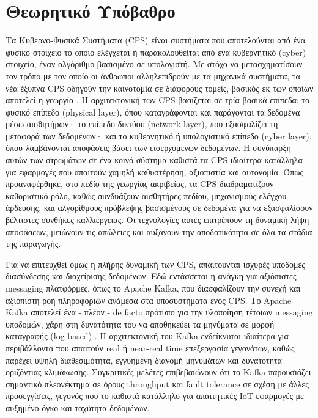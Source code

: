 \chapter{Θεωρητικό Υπόβαθρο}

Τα Κυβερνο-Φυσικά Συστήματα (CPS) είναι συστήματα που αποτελούνται από ένα
φυσικό στοιχείο το οποίο ελέγχεται ή παρακολουθείται από ένα κυβερνητικό
(cyber) στοιχείο, έναν αλγόριθμο βασισμένο σε υπολογιστή. Με στόχο να
μετασχηματίσουν τον τρόπο με τον οποίο οι άνθρωποι αλληλεπιδρούν με τα μηχανικά
συστήματα, τα νέα έξυπνα CPS οδηγούν την καινοτομία σε διάφορους τομείς,
βασικός εκ των οποίων αποτελεί η γεωργία \cite{cps}. Η αρχιτεκτονική των CPS
βασίζεται σε τρία βασικά επίπεδα: το φυσικό επίπεδο (physical layer), όπου
καταγράφονται και παράγονται τα δεδομένα μέσω αισθητήρων· το επίπεδο δικτύου
(network layer), που εξασφαλίζει τη μεταφορά των δεδομένων· και το κυβερνητικό
ή υπολογιστικό επίπεδο (cyber layer), όπου λαμβάνονται αποφάσεις βάσει των
εισερχόμενων δεδομένων. Η συνύπαρξη αυτών των στρωμάτων σε ένα κοινό σύστημα
καθιστά τα CPS ιδιαίτερα κατάλληλα για εφαρμογές που απαιτούν χαμηλή
καθυστέρηση, αξιοπιστία και αυτονομία. Όπως προαναφέρθηκε, στο πεδίο της
γεωργίας ακριβείας, τα CPS διαδραματίζουν καθοριστικό ρόλο, καθώς συνδυάζουν
αισθητήρες πεδίου, μηχανισμούς ελέγχου άρδευσης, και αλγορίθμους πρόβλεψης
βασισμένους σε δεδομένα για να εξασφαλίσουν βέλτιστες συνθήκες καλλιέργειας. Οι
τεχνολογίες αυτές επιτρέπουν τη δυναμική λήψη αποφάσεων, μειώνουν τις απώλειες
και αυξάνουν την αποδοτικότητα σε όλα τα στάδια της παραγωγής.

Για να επιτευχθεί όμως η πλήρης δυναμική των CPS, απαιτούνται ισχυρές υποδομές
διασύνδεσης και διαχείρισης δεδομένων. Εδώ εντάσσεται η ανάγκη για αξιόπιστες
messaging πλατφόρμες, όπως το Apache Kafka, που διασφαλίζουν την συνεχή και
αξιόπιστη ροή πληροφοριών ανάμεσα στα υποσυστήματα ενός CPS. Το Apache Kafka
αποτελεί ένα - πλέον - de facto πρότυπο για την υλοποίηση τέτοιων messaging
υποδομών, χάρη στη δυνατότητα του να αποθηκεύει τα μηνύματα σε μορφή καταγραφής
(log-based) \cite{kafkabdd}. Η αρχιτεκτονική του Kafka ενδείκνυται ιδιαίτερα
για περιβάλλοντα που απαιτούν real ή near-real time επεξεργασία γεγονότων,
καθώς παρέχει υψηλή διαθεσιμότητα, εγγυημένη διανομή μηνυμάτων και δυνατότητα
οριζόντιας κλιμάκωσης. Συγκριτικές μελέτες \cite{rtkafka} επιβεβαιώνουν ότι το
Kafka παρουσιάζει σημαντικό πλεονέκτημα σε όρους throughput και fault tolerance
σε σχέση με άλλες προσεγγίσεις, γεγονός που το καθιστά κατάλληλο για
απαιτητικές IoT εφαρμογές με αυξημένο όγκο και ταχύτητα δεδομένων.

